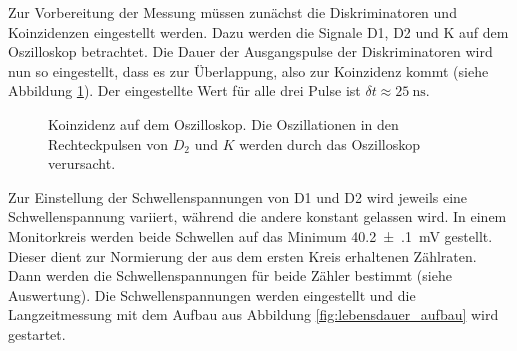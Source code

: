 Zur Vorbereitung der Messung müssen zunächst die Diskriminatoren und Koinzidenzen eingestellt werden. Dazu werden die Signale D1, D2 und K auf dem Oszilloskop betrachtet. Die Dauer der Ausgangspulse der Diskriminatoren wird nun so eingestellt, dass es zur Überlappung, also zur Koinzidenz kommt (siehe Abbildung \ref{fig:signal_oszi}). Der eingestellte Wert für alle drei Pulse ist $\delta t \approx \SI{25}{\nano\second}$. \\

\begin{figure}[h]
  \centering
  \caption{Koinzidenz auf dem Oszilloskop. Die Oszillationen in den Rechteckpulsen von $D_2$ und $K$ werden durch das Oszilloskop verursacht.}
  \label{fig:signal_oszi}
\end{figure}

Zur Einstellung der Schwellenspannungen von D1 und D2 wird jeweils eine Schwellenspannung variiert, während die andere konstant gelassen wird. In einem Monitorkreis werden beide Schwellen auf das Minimum \SI[separate-uncertainty = true]{40.2(1)}{\milli\volt} gestellt. Dieser dient zur Normierung der aus dem ersten Kreis erhaltenen Zählraten. Dann werden die Schwellenspannungen für beide Zähler bestimmt (siehe Auswertung). Die Schwellenspannungen werden eingestellt und die Langzeitmessung mit dem Aufbau aus Abbildung \ref{fig:lebensdauer_aufbau} wird gestartet.
